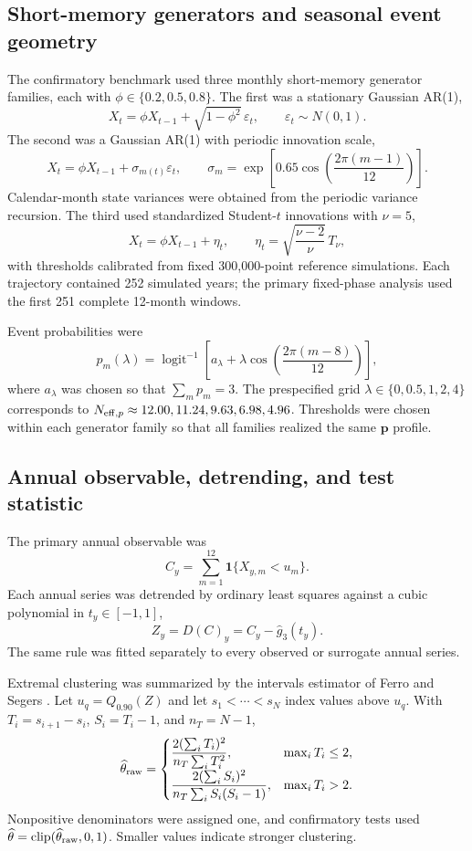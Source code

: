 \subsection{Short-memory generators and seasonal event geometry}\label{sec:generators}

The confirmatory benchmark used three monthly short-memory generator families, each with $\phi\in\{0.2,0.5,0.8\}$. The first was a stationary Gaussian AR(1),
\[
X_t=\phi X_{t-1}+\sqrt{1-\phi^2}\,\varepsilon_t,
\qquad \varepsilon_t\sim N(0,1).
\]
The second was a Gaussian AR(1) with periodic innovation scale,
\[
X_t=\phi X_{t-1}+\sigma_{m(t)}\varepsilon_t,
\qquad
\sigma_m=\exp\!\left[0.65\cos\!\left(\frac{2\pi(m-1)}{12}\right)\right].
\]
Calendar-month state variances were obtained from the periodic variance recursion. The third used standardized Student-$t$ innovations with $\nu=5$,
\[
X_t=\phi X_{t-1}+\eta_t,
\qquad
\eta_t=\sqrt{\frac{\nu-2}{\nu}}\,T_\nu,
\]
with thresholds calibrated from fixed 300,000-point reference simulations. Each trajectory contained 252 simulated years; the primary fixed-phase analysis used the first 251 complete 12-month windows.

Event probabilities were
\begin{equation}
p_m(\lambda)=\operatorname{logit}^{-1}\!\left[a_\lambda+\lambda\cos\!\left(\frac{2\pi(m-8)}{12}\right)\right],
\label{eq:profile}
\end{equation}
where $a_\lambda$ was chosen so that $\sum_m p_m=3$. The prespecified grid $\lambda\in\{0,0.5,1,2,4\}$ corresponds to $N_{\mathrm{eff},p}\approx12.00,11.24,9.63,6.98,4.96$. Thresholds were chosen within each generator family so that all families realized the same $\mathbf p$ profile.

\subsection{Annual observable, detrending, and test statistic}\label{sec:observable}

The primary annual observable was
\[
C_y=\sum_{m=1}^{12}\mathbf 1\{X_{y,m}<u_m\}.
\]
Each annual series was detrended by ordinary least squares against a cubic polynomial in $t_y\in[-1,1]$,
\[
Z_y=D(C)_y=C_y-\widehat g_3(t_y).
\]
The same rule was fitted separately to every observed or surrogate annual series.

Extremal clustering was summarized by the intervals estimator of Ferro and Segers \cite{FerroSegers2003}. Let $u_q=Q_{0.90}(Z)$ and let $s_1<\cdots<s_N$ index values above $u_q$. With $T_i=s_{i+1}-s_i$, $S_i=T_i-1$, and $n_T=N-1$,
\[
\widehat\theta_{\rm raw}=
\begin{cases}
\dfrac{2(\sum_iT_i)^2}{n_T\sum_iT_i^2},&\max_iT_i\le2,\\[1.4ex]
\dfrac{2(\sum_iS_i)^2}{n_T\sum_iS_i(S_i-1)},&\max_iT_i>2.
\end{cases}
\]
Nonpositive denominators were assigned one, and confirmatory tests used $\widehat\theta=\operatorname{clip}(\widehat\theta_{\rm raw},0,1)$. Smaller values indicate stronger clustering.

